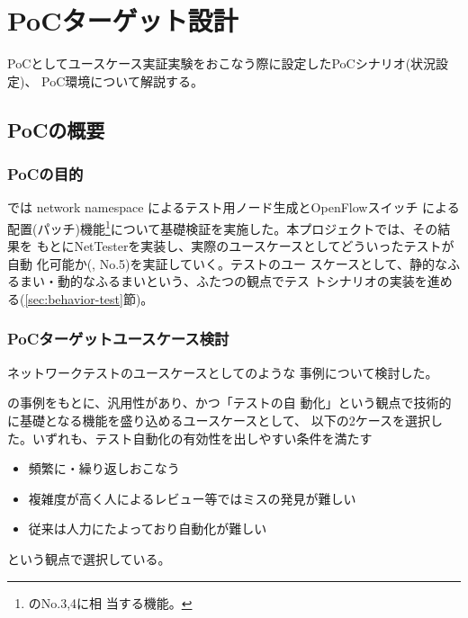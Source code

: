 
\chapter{PoCターゲット設計}
\label{chap:poc-target-design}

PoCとしてユースケース実証実験をおこなう際に設定したPoCシナリオ(状況設定)、
PoC環境について解説する。


 \section{PoCの概要}
 \label{sec:poc-overview}



 \subsection{PoCの目的}
 \label{sec:poc-purpose}

\lopjc では network namespace によるテスト用ノード生成とOpenFlowスイッチ
による配置(パッチ)機能\footnote{のNo.3,4に相
当する機能。}について基礎検証を実施した。本プロジェクトでは、その結果を
もとにNetTesterを実装し、実際のユースケースとしてどういったテストが自動
化可能か(, No.5)を実証していく。テストのユー
スケースとして、静的なふるまい・動的なふるまいという、ふたつの観点でテス
トシナリオの実装を進める(\ref{sec:behavior-test}節)。

  \subsection{PoCターゲットユースケース検討}
  \label{sec:poc-usecase-discuss}

ネットワークテストのユースケースとしてのような
事例について検討した。

の事例をもとに、汎用性があり、かつ「テストの自
動化」という観点で技術的に基礎となる機能を盛り込めるユースケースとして、
以下の2ケースを選択した。いずれも、テスト自動化の有効性を出しやすい条件を満たす
\begin{itemize}
 \item 頻繁に・繰り返しおこなう
 \item 複雑度が高く人によるレビュー等ではミスの発見が難しい
 \item 従来は人力にたよっており自動化が難しい
\end{itemize}
という観点で選択している。

